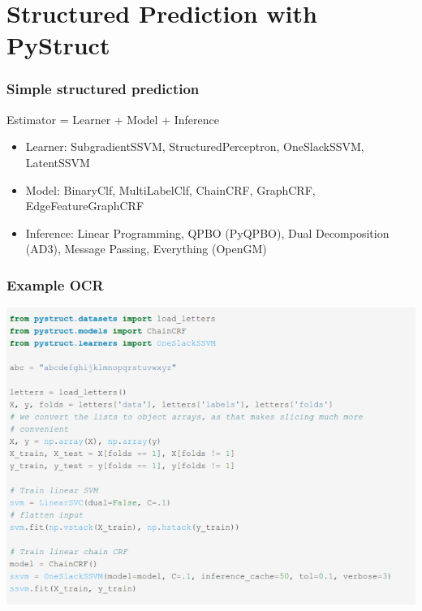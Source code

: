 \documentclass[final,ignorenonframetext,compress]{beamer}
\begin{document}
\section{Structured Prediction with PyStruct}

    \begin{frame}
        \frametitle{Simple structured prediction}
        Estimator = Learner + Model + Inference\\

        \begin{itemize}
            \item<2-> Learner: SubgradientSSVM, StructuredPerceptron, OneSlackSSVM, LatentSSVM
            \item<2-> Model: BinaryClf, MultiLabelClf, ChainCRF, GraphCRF, EdgeFeatureGraphCRF
            \item<2-> Inference: Linear Programming, QPBO (PyQPBO), Dual Decomposition (AD3), Message Passing, Everything (OpenGM)
        \end{itemize}

    \end{frame}

    \begin{frame}
        \frametitle{Example OCR}
        \includegraphics[width=.7\linewidth]{images/code_letters}
    \end{frame}
\end{document}
